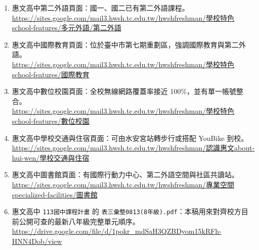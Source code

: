 \documentclass[
  chinese,
  12pt,
  a4paper,
  oneside]{article}
\providecommand{\tightlist}{%
  \setlength{\itemsep}{0pt}\setlength{\parskip}{0pt}}
\begin{document}
\begin{enumerate}
\def\labelenumi{\arabic{enumi}.}
\tightlist
\item
  惠文高中第二外語頁面：國一、國二已有第二外語課程。\\
  \href{https://sites.google.com/mail3.hwsh.tc.edu.tw/hwshfreshman/\%E5\%AD\%B8\%E6\%A0\%A1\%E7\%89\%B9\%E8\%89\%B2school-features/\%E5\%A4\%9A\%E5\%85\%83\%E5\%A4\%96\%E8\%AA\%9E/\%E7\%AC\%AC\%E4\%BA\%8C\%E5\%A4\%96\%E8\%AA\%9E}{https://sites.google.com/mail3.hwsh.tc.edu.tw/hwshfreshman/學校特色school-features/多元外語/第二外語}
\item
  惠文高中國際教育頁面：位於臺中市第七期重劃區，強調國際教育與第二外語。\\
  \href{https://sites.google.com/mail3.hwsh.tc.edu.tw/hwshfreshman/\%E5\%AD\%B8\%E6\%A0\%A1\%E7\%89\%B9\%E8\%89\%B2school-features/\%E5\%9C\%8B\%E9\%9A\%9B\%E6\%95\%99\%E8\%82\%B2}{https://sites.google.com/mail3.hwsh.tc.edu.tw/hwshfreshman/學校特色school-features/國際教育}
\item
  惠文高中數位校園頁面：全校無線網路覆蓋率接近
  100\%，並有單一帳號整合。\\
  \href{https://sites.google.com/mail3.hwsh.tc.edu.tw/hwshfreshman/\%E5\%AD\%B8\%E6\%A0\%A1\%E7\%89\%B9\%E8\%89\%B2school-features/\%E6\%95\%B8\%E4\%BD\%8D\%E6\%A0\%A1\%E5\%9C\%92}{https://sites.google.com/mail3.hwsh.tc.edu.tw/hwshfreshman/學校特色school-features/數位校園}
\item
  惠文高中學校交通與住宿頁面：可由水安宮站轉步行或搭配 YouBike 到校。\\
  \href{https://sites.google.com/mail3.hwsh.tc.edu.tw/hwshfreshman/\%E8\%AA\%8D\%E8\%AD\%98\%E6\%83\%A0\%E6\%96\%87about-hui-wen/\%E5\%AD\%B8\%E6\%A0\%A1\%E4\%BA\%A4\%E9\%80\%9A\%E8\%88\%87\%E4\%BD\%8F\%E5\%AE\%BF}{https://sites.google.com/mail3.hwsh.tc.edu.tw/hwshfreshman/認識惠文about-hui-wen/學校交通與住宿}
\item
  惠文高中圖書館頁面：有國際行動力中心、第二外語空間與社區共讀站。\\
  \href{https://sites.google.com/mail3.hwsh.tc.edu.tw/hwshfreshman/\%E5\%B0\%88\%E6\%A5\%AD\%E7\%A9\%BA\%E9\%96\%93specialized-facilities/\%E5\%9C\%96\%E6\%9B\%B8\%E9\%A4\%A8}{https://sites.google.com/mail3.hwsh.tc.edu.tw/hwshfreshman/專業空間specialized-facilities/圖書館}
\item
  惠文高中 \texttt{113國中課程計畫} 的
  \texttt{表三彙整0813(8年級).pdf}：本稿用來對齊校方目前公開可查的最新八年級完整單元順序。\\
  \url{https://drive.google.com/file/d/1pokr_mdSaH3QZBDyom15kRFh-HNN4Dob/view}

\end{enumerate}
\end{document}

